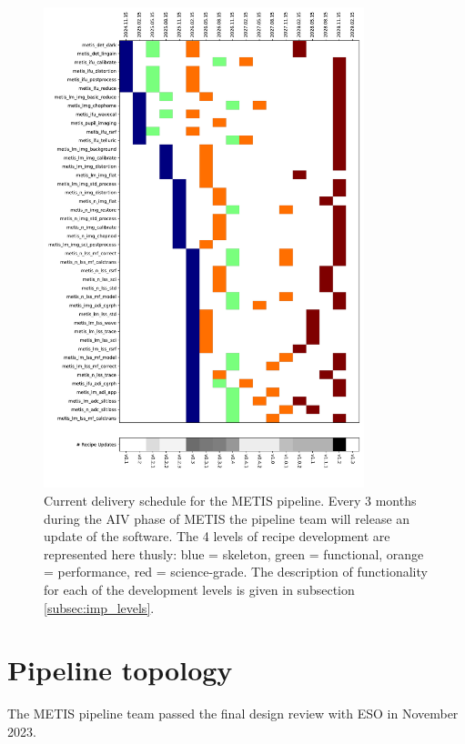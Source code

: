 \documentclass[a4paper]{spie}  %
\begin{document}
\begin{figure}
    \centering
    \includegraphics[width=0.83\textwidth]{SPIE_paper/figures/deliveries_recipes.pdf}
    \caption{Current delivery schedule for the METIS pipeline. Every 3 months during the AIV phase of METIS the pipeline team will release an update of the software. The 4 levels of recipe development are represented here thusly: blue = skeleton, green = functional, orange = performance, red = science-grade. The description of functionality for each of the development levels is given in subsection \ref{subsec:imp_levels}.}
    \label{fig:del_schedule}
\end{figure}

\section{Pipeline topology}
\label{sec:pip}

The METIS pipeline team passed the final design review with ESO in November 2023. 
\end{document}
